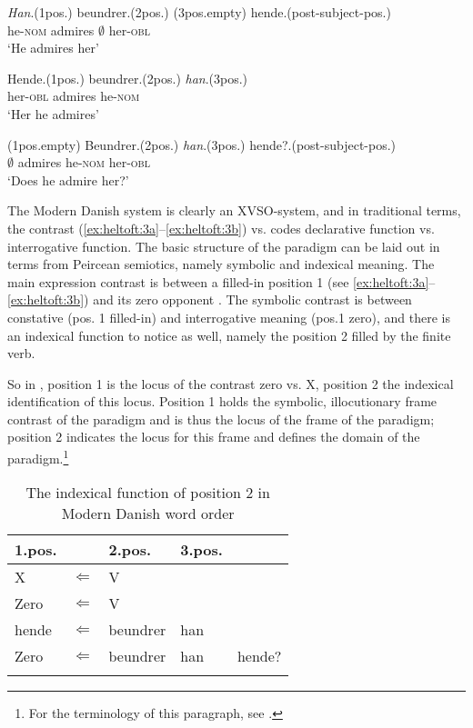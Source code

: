\documentclass[output=paper]{langscibook}
\begin{document}
\ea \label{ex:heltoft:3} 
\ea \label{ex:heltoft:3a} 
    \gll \textit{Han}.(1pos.)    beundrer.(2pos.)   (3pos.empty)  hende.(post-subject-pos.)    \\
                 he-\textsc{nom} admires            ${\emptyset}$    her-\textsc{obl}\\
    \glt ‘He admires her'

\ex \label{ex:heltoft:3b}
     \gll Hende.(1pos.)     beundrer.(2pos.)    \textit{han}.(3pos.)    \\
          her-\textsc{obl}  admires              he-\textsc{nom}\\
    \glt ‘Her he admires'

 \ex \label{ex:heltoft:3c}
     \gll (1pos.empty)    Beundrer.(2pos.)  \textit{han}.(3pos.)    hende?.(post-subject-pos.)    \\
          ${\emptyset}$        admires              he-\textsc{nom}  her-\textsc{obl}\\
    \glt  ‘Does he admire her?'
\z\z

The Modern Danish system is clearly an XVSO-system, and in traditional terms, the contrast (\ref{ex:heltoft:3a}--\ref{ex:heltoft:3b}) vs.  codes declarative function vs. interrogative function. The basic structure of the paradigm can be laid out in terms from Peircean semiotics, namely symbolic and indexical meaning. The main expression contrast is between a filled-in position 1 (see \ref{ex:heltoft:3a}--\ref{ex:heltoft:3b}) and its zero opponent . The symbolic contrast is between constative (pos. 1 filled-in) and interrogative meaning (pos.1 zero), and there is an indexical function to notice as well, namely the position 2 filled by the finite verb.

So in , position 1 is the locus of the contrast zero vs. X, position 2 the indexical identification of this locus. Position 1 holds the symbolic, illocutionary frame contrast of the paradigm and is thus the locus of the frame of the paradigm; position 2 indicates the locus for this frame and defines the domain of the paradigm.\footnote{For the terminology of this paragraph, see \citet{Nørgård-Sørensen2011, Nørgård-Sørensen2015, Heltoft2019}.} 
  
\begin{table} 
\caption{The indexical function of position 2 in Modern Danish word order\label{tab:heltoft:2}}
\begin{tabular}{lclll}
\lsptoprule
    1.pos. & & 2.pos. & 3.pos.& \\\midrule
    X  & ${\Leftarrow}$   &   V & & \\
    Zero & ${\Leftarrow}$  &   V & &  \\
    hende & ${\Leftarrow}$ &   beundrer  &  han \\
    Zero & ${\Leftarrow}$  &   beundrer  &  han & hende?\\
\lspbottomrule
\end{tabular}
\end{table}
\end{document}
